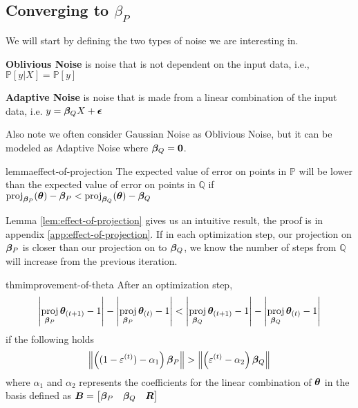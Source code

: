 \documentclass{article} %
\DeclareMathOperator{\proj}{proj}
\newcommand{\norm}[1]{\left\lVert#1\right\rVert}
\begin{document}
	\subsection{Converging to $\beta_P$}
	
	We will start by defining the two types of noise we are interesting in. 
	\begin{definition}
		\textbf{Oblivious Noise} is noise that is not dependent on the input data, i.e., $\displaystyle \mathbb{P}\left[y | X\right] = \mathbb{P}\left[y\right]$
	\end{definition}
	\begin{definition}
		\textbf{Adaptive Noise} is noise that is made from a linear combination of the input data, i.e. $\displaystyle y = {\bm{\beta}}_QX + {\bm{{\epsilon}}}$
	\end{definition}
	Also note we often consider Gaussian Noise as Oblivious Noise, but it can be modeled as Adaptive Noise where ${\bm{\beta}}_Q = {\bm{0}}$. 

	\begin{restatable}{lemma}{effect-of-projection}
		\label{lem:effect-of-projection}
		The expected value of error on points in $\mathbb{P}$ will be lower than the expected value of error on points in $\mathbb{Q}$ if $\proj_{\vbeta_P}(\vtheta) - \vbeta_P < \proj_{\vbeta_Q}(\vtheta) - \vbeta_Q$
	\end{restatable}
	
	Lemma \ref{lem:effect-of-projection} gives us an intuitive result, the proof is in appendix \ref{app:effect-of-projection}. If in each optimization step, our projection on ${\bm{\beta}}_P$ is closer than our projection on to ${\bm{\beta}}_Q$, we know the number of steps from $\mathbb{Q}$ will increase from the previous iteration.
	\begin{restatable}{thm}{improvement-of-theta}
		\label{thm:improvement-of-theta}
		After an optimization step, 
		\begin{equation*}
			\left|\proj_{\vbeta_P}\vtheta_{(t+1)} -1 \right| - \left|\proj_{\vbeta_P}\vtheta_{(t)} -1 \right| <  \left|\proj_{\vbeta_Q}\vtheta_{(t+1)} - 1\right| - \left|\proj_{\vbeta_Q}\vtheta_{(t)} - 1\right|
		\end{equation*}
			  if the following holds
		\begin{equation}
			\norm{\left((1-\varepsilon^{(t)}) - \alpha_1\right)\vbeta_P} > \norm{\left(\varepsilon^{(t)} - \alpha_2\right)\vbeta_Q}
		\end{equation}
		where $\alpha_1$ and $\alpha_2$ represents the coefficients for the linear combination of ${\bm{\theta}}$ in the basis defined as ${\bm{B}} = \begin{bmatrix} {\bm{\beta}}_P & {\bm{\beta}}_Q & {\bm{R}}\end{bmatrix}$
	\end{restatable}
\end{document}
